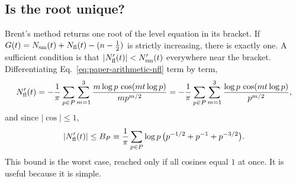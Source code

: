 \subsection{Is the root unique?}

Brent's method returns one root of the level equation in its bracket. If $G(t)=N_{\mathrm{sm}}(t)+N_{\mathrm{fl}}(t)-(n-\tfrac12)$ is strictly increasing, there is exactly one. A sufficient condition is that $|N_{\mathrm{fl}}'(t)|<N_{\mathrm{sm}}'(t)$ everywhere near the bracket. Differentiating Eq.~\eqref{eq:paper-arithmetic-nfl} term by term,
\begin{equation}
N_{\mathrm{fl}}'(t) = -\frac{1}{\pi}\sum_{p\in P}\sum_{m=1}^3 \frac{m\log p\,\cos(m t\log p)}{m p^{m/2}}
= -\frac{1}{\pi}\sum_{p\in P}\sum_{m=1}^3 \frac{\log p\,\cos(m t\log p)}{p^{m/2}} ,
\label{eq:paper-arithmetic-dnfl}
\end{equation}
and since $|\cos|\le1$,
\begin{equation}
|N_{\mathrm{fl}}'(t)| \le B_P \equiv \frac{1}{\pi}\sum_{p\in P}\log p\,\bigl(p^{-1/2}+p^{-1}+p^{-3/2}\bigr).
\label{eq:paper-arithmetic-bound}
\end{equation}
This bound is the worst case, reached only if all cosines equal $1$ at once. It is useful because it is simple.

